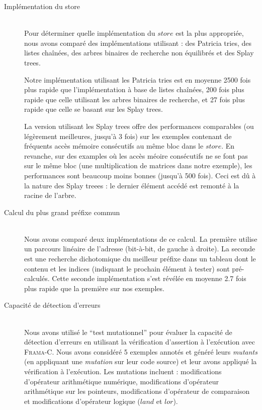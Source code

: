 \begin{description}

\item[Implémentation du store] \hfill \\
Pour déterminer quelle implémentation du $store$ est la plus appropriée, nous
avons comparé des implémentations utilisant : des Patricia tries, des listes
chaînées, des arbres binaires de recherche non équilibrés et des Splay trees.

Notre implémentation utilisant les Patricia tries est en moyenne 2500 fois plus
rapide que l'implémentation à base de listes chaînées, 200 fois plus rapide que
celle utilisant les arbres binaires de recherche, et 27 fois plus rapide que
celle se basant sur les Splay trees.

La version utilisant les Splay trees offre
des performances comparables (ou légèrement meilleures, jusqu'à 3 fois) sur les
exemples contenant de fréquents accès mémoire consécutifs au même bloc dans le
$store$. En revanche, sur des examples où les accès méoire consécutifs ne se
font pas sur le même bloc (une multiplication de matrices dans notre exemple),
les performances sont beaucoup moins bonnes (jusqu'à 500 fois). Ceci est dû à
la nature des Splay treees : le dernier élément accédé est remonté à la racine
de l'arbre.

\item[Calcul du plus grand préfixe commun] \hfill \\
Nous avons comparé deux implémentations de ce calcul. La première utilise un
parcours linéaire de l'adresse (bit-à-bit, de gauche à droite). La seconde
est une recherche dichotomique du meilleur préfixe dans un tableau dont le
contenu et les indices (indiquant le prochain élément à tester) sont
pré-calculés. Cette seconde implémentation s'est révélée en moyenne 2.7 fois
plus rapide que la première sur nos exemples.

\item[Capacité de détection d'erreurs] \hfill \\
Nous avons utilisé le ``test mutationnel'' pour évaluer la capacité de détection
d'erreurs en utilisant la vérification d'assertion à l'exécution avec
\textsc{Frama-C}. Nous avons considéré 5 exemples annotés et généré leurs
{\em mutants} (en appliquant une {\em mutation} sur leur code source) et leur
avons appliqué la vérification à l'exécution. Les mutations incluent :
modifications d'opérateur arithmétique numérique, modifications d'opérateur
arithmétique sur les pointeurs, modifications d'opérateur de comparaison et
modifications d'opérateur logique ($land$ et $lor$).


\end{description}

